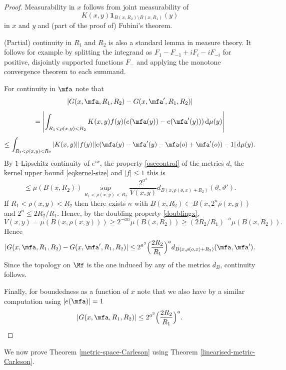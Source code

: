\begin{proof}
    \leanok
    Measurability in $x$ follows from joint measurability of
    \[
        K(x,y) \mathbf{1}_{B(x,R_2) \setminus B(x,R_1)}(y)
    \]
    in $x$ and $y$ and (part of the proof of) Fubini's theorem.

    (Partial) continuity in $R_1$ and $R_2$ is also a standard lemma in measure theory. It follows for example by splitting the integrand as $F_1 - F_{-1} + iF_i - iF_{-i}$ for positive, disjointly supported functions $F_{-}$ and applying the monotone convergence theorem to each summand.

    For continuity in $\mfa$ note that
    \[
        |G(x, \mfa, R_1, R_2) - G(x, \mfa', R_1, R_2)|
    \]
    \[
        = \left| \int_{R_1 < \rho(x,y) < R_2} K(x,y) f(y) (e(\mfa(y)) - e(\mfa'(y))) \, \mathrm{d}\mu(y) \right|
    \]
    \[
        \le \int_{R_1 < \rho(x,y) < R_2} |K(x,y)| |f(y)| |e(\mfa(y) - \mfa'(y) - \mfa(o) + \mfa'(o)) - 1| \, \mathrm{d}\mu(y).
    \]
    By $1$-Lipschitz continuity of $e^{ix}$, the property \eqref{osccontrol} of the metrics $d$, the kernel upper bound \eqref{eqkernel-size} and $|f| \le 1$ this is
    \[
        \le \mu(B(x, R_2)) \sup_{R_1 < \rho(x,y) < R_2} \frac{2^{a^3}}{V(x,y)} d_{B(x,\rho(o,x)+R_2)}(\vartheta, \vartheta').
    \]
    If $R_1 < \rho(x,y) < R_2$ then there exists $n$ with $B(x,R_2) \subset B(x, 2^n \rho(x,y))$ and $2^n \le 2 R_2/R_1$. Hence, by the doubling property \eqref{doublingx},
    \[
        V(x,y) = \mu(B(x, \rho(x,y))) \ge 2^{-an} \mu(B(x, R_2)) \ge (2R_2 / R_1)^{-a} \mu(B(x, R_2)).
    \]
    Hence
    \[
        |G(x, \mfa, R_1, R_2) - G(x, \mfa', R_1, R_2)| \le 2^{a^3} \Big(\frac{2R_2}{R_1}\Big)^a d_{B(x, \rho(o,x)+R_2)}(\mfa, \mfa').
    \]
    Since the topology on $\Mf$ is the one induced by any of the metrics $d_B$, continuity follows.

    Finally, for boundedness as a function of $x$ note that we also have by a similar computation using $|e(\mfa)|=1$
    \[
        |G(x, \mfa, R_1, R_2)| \le 2^{a^3} \Big(\frac{2R_2}{R_1}\Big)^a.
    \]
\end{proof}

We now prove Theorem \ref{metric-space-Carleson} using Theorem \ref{linearised-metric-Carleson}.

